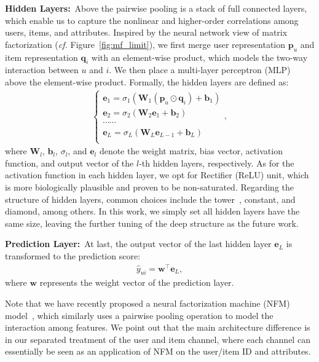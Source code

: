 \documentclass[sigconf]{acmart}
\newcommand{\Trans}[1]{{#1}^{\top}}
\newcommand{\Mat}[1]{\mathbf{#1}}
\newcommand{\cf}{\emph{cf. }}
\begin{document}
\textbf{Hidden Layers:}~Above the pairwise pooling is a stack of full connected layers, which enable us to capture the nonlinear and higher-order correlations among users, items, and attributes.
Inspired by the neural network view of matrix factorization (\cf Figure~\ref{fig:mf_limit}), we first merge user representation $\Mat{p}_{u}$ and item representation $\Mat{q}_i$ with an element-wise product, which models the two-way interaction between $u$ and $i$. We then place a multi-layer perceptron (MLP) above the element-wise product. Formally, the hidden layers are defined as:
\begin{gather}\label{equ:fully-connected-layer}
\begin{cases}
\Mat{e}_{1}=\sigma_{1}(\Mat{W}_{1}(\Mat{p}_{u}\odot\Mat{q}_{i})+\Mat{b}_{1})\\
\Mat{e}_{2}=\sigma_{2}(\Mat{W}_{2}\Mat{e}_{1}+\Mat{b}_{2})\\
\cdots\cdots\\
\Mat{e}_{L}=\sigma_{L}(\Mat{W}_{L}\Mat{e}_{L-1}+\Mat{b}_{L})\\
\end{cases},
\end{gather}
where $\Mat{W}_{l}$, $\Mat{b}_{l}$, $\sigma_{l}$, and $\Mat{e}_{l}$ denote the weight matrix, bias vector, activation function, and output vector of the $l$-th hidden layers, respectively. As for the activation function in each hidden layer, we opt for Rectifier (ReLU) unit, which is more biologically plausible and proven to be non-saturated.
Regarding the structure of hidden layers, common choices include the tower~\cite{heneural,DBLP:conf/recsys/CovingtonAS16}, constant, and diamond, among others. In this work, we simply set all hidden layers have the same size, leaving the further tuning of the deep structure as the future work.

\textbf{Prediction Layer:}~At last, the output vector of the last hidden layer $\Mat{e}_{L}$ is transformed to the prediction score:
\begin{gather}\label{equ:prediction-layer}
\hat{y}_{ui}=\Trans{\Mat{w}}\Mat{e}_{L},
\end{gather}
where $\Mat{w}$ represents the weight vector of the prediction layer.

Note that we have recently proposed a neural factorization machine (NFM) model~\cite{he2017neural}, which similarly uses a pairwise pooling operation to model the interaction among features. We point out that the main architecture difference is in our separated treatment of the user and item channel, where each channel can essentially be seen as an application of NFM on the user/item ID and attributes.
\end{document}
